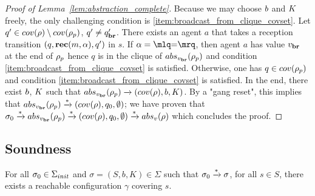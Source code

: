 \begin{proof}[Proof of Lemma~\ref{lem:abstraction_complete}]
	Because we may choose $\boss$ and $\clique$ freely, the only challenging condition is \ref{item:broadcast_from_clique_covset}.
	Let $q' \in \statesin{\run} \setminus \statesin{\run_p}$, $q' \ne q_{\textbf{br}}'$. 
	There exists an agent $a$ that takes a reception transition $(q,\textbf{rec}(m, \alpha),q')$ in $s$. 
	If $\anact = \quotemarks{\eqtestact}$, then agent $a$ has value $v_{\textbf{br}}$ at the end of $\rho_p$ hence $q$ is in the clique of $\absproj{\avalbr}{\run_p}$ and condition \ref{item:broadcast_from_clique_covset} is satisfied. Otherwise, one has $q \in \statesin{\run_p}$ and condition \ref{item:broadcast_from_clique_covset} is satisfied.
	In the end, there exist $\boss$, $\clique$ such that $\absproj{\avalbr}{\run_p} \step{} (\statesin{\run}, \boss,\clique)$. By a "gang reset", this implies that $\absproj{\avalbr}{\run_p} \step{*} (\statesin{\run}, q_0, \emptyset)$; we have proven that $\aconfiginit \step{*}\absproj{\avalbr}{\run_p} \step{*} (\statesin{\run}, q_0, \emptyset) \step{*} \absproj{\aval}{\run}$ which concludes the proof. 
\end{proof}
\fi


\subsection{Soundness}
\label{sec:one-soundness}

\begin{corollary}
	\label{cor:soundness}
	For all $\sigma_0 \in \aconfiginitset$ and $\sigma = (S, b, K) \in \Sigma$ such that $\sigma_0 \xrightarrow{*} \sigma$, for all $s \in S$, there exists a reachable configuration $\gamma$ covering $s$.
\end{corollary}

